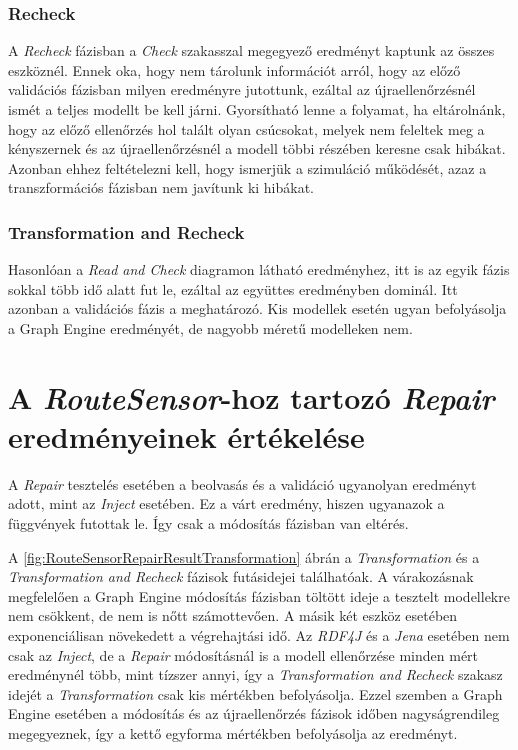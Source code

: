 \subsubsection{Recheck}

A \emph{Recheck} fázisban a \emph{Check} szakasszal megegyező eredményt kaptunk az összes eszköznél. Ennek oka, hogy nem tárolunk információt arról, hogy az előző validációs fázisban milyen eredményre jutottunk, ezáltal az újraellenőrzésnél ismét a teljes modellt be kell járni. Gyorsítható lenne a folyamat, ha eltárolnánk, hogy az előző ellenőrzés hol talált olyan csúcsokat, melyek nem feleltek meg a kényszernek és az újraellenőrzésnél a modell többi részében keresne csak hibákat. Azonban ehhez feltételezni kell, hogy ismerjük a szimuláció működését, azaz a transzformációs fázisban nem javítunk ki hibákat.

\subsubsection{Transformation and Recheck}

Hasonlóan a \emph{Read and Check} diagramon látható eredményhez, itt is az egyik fázis sokkal több idő alatt fut le, ezáltal az együttes eredményben dominál. Itt azonban a validációs fázis a meghatározó. Kis modellek esetén ugyan befolyásolja a Graph Engine eredményét, de nagyobb méretű modelleken nem.

\section{A \emph{RouteSensor}-hoz tartozó \emph{Repair} eredményeinek értékelése}

A \emph{Repair} tesztelés esetében a beolvasás és a validáció ugyanolyan eredményt adott, mint az \emph{Inject} esetében. Ez a várt eredmény, hiszen ugyanazok a függvények futottak le. Így csak a módosítás fázisban van eltérés.

A \ref{fig:RouteSensorRepairResultTransformation} ábrán a \emph{Transformation} és a \emph{Transformation and Recheck} fázisok futásidejei találhatóak. A várakozásnak megfelelően a Graph Engine módosítás fázisban töltött ideje a tesztelt modellekre nem csökkent, de nem is nőtt számottevően. A másik két eszköz esetében exponenciálisan növekedett a végrehajtási idő. Az \emph{RDF4J} és a \emph{Jena} esetében nem csak az \emph{Inject}, de a \emph{Repair} módosításnál is a modell ellenőrzése minden mért eredménynél több, mint tízszer annyi, így a \emph{Transformation and Recheck} szakasz idejét a \emph{Transformation} csak kis mértékben befolyásolja. Ezzel szemben a Graph Engine esetében a módosítás és az újraellenőrzés fázisok időben nagyságrendileg megegyeznek, így a kettő egyforma mértékben befolyásolja az eredményt.

